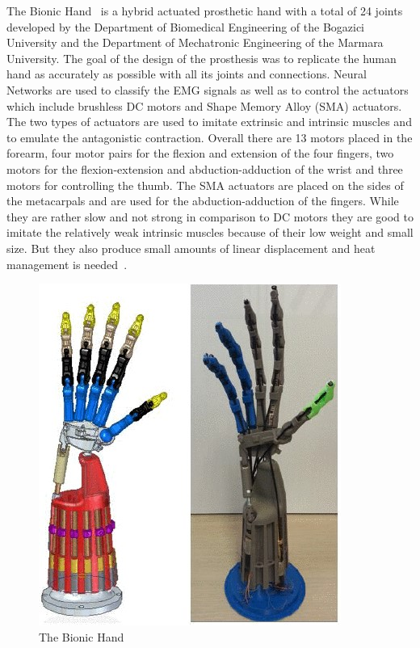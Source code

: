\documentclass[a4paper, 10pt, conference]{ieeeconf}      %
\begin{document}
The Bionic Hand~\cite{bionichand} is a hybrid actuated prosthetic hand with a total of 24 joints developed by the Department of Biomedical Engineering of the Bogazici University and the Department of Mechatronic Engineering of the Marmara University. The goal of the design of the prosthesis was to replicate the human hand as accurately as possible with all its joints and connections. Neural Networks are used to classify the EMG signals as well as to control the actuators which include brushless DC motors and Shape Memory Alloy (SMA) actuators. The two types of actuators are used to imitate extrinsic and intrinsic muscles and to emulate the antagonistic contraction. Overall there are 13 motors placed in the forearm, four motor pairs for the flexion and extension of the four fingers, two motors for the flexion-extension and abduction-adduction of the wrist and three motors for controlling the thumb. The SMA actuators are placed on the sides of the metacarpals and are used for the abduction-adduction of the fingers. While they are rather slow and not strong in comparison to DC motors they are good to imitate the relatively weak intrinsic muscles because of their low weight and small size. But they also produce small amounts of linear displacement and heat management is needed~\cite{bundhoo}.

\begin{figure}[h]

	\centering
	\includegraphics[scale=0.6]{images/BionicHand}
	
	\caption{The Bionic Hand}
\end{figure}
\end{document}

